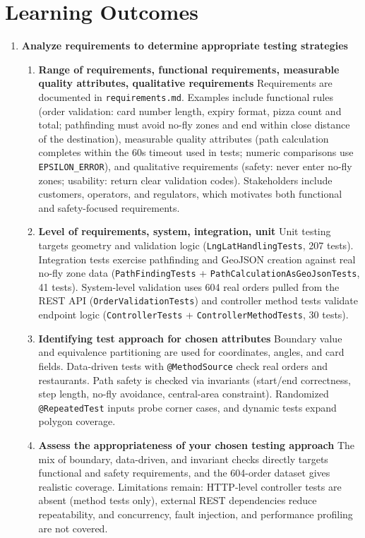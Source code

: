 \documentclass{article}
\begin{document}
\section{Learning Outcomes}
\begin{enumerate}
\item \textbf{Analyze requirements to determine appropriate testing strategies} \marginpar{[default 20\%]}
\begin{enumerate}
\item \textbf{Range of requirements, functional requirements, measurable quality attributes, qualitative requirements}
Requirements are documented in \texttt{requirements.md}. Examples include functional rules (order validation: card number length, expiry format, pizza count and total; pathfinding must avoid no-fly zones and end within close distance of the destination), measurable quality attributes (path calculation completes within the 60s timeout used in tests; numeric comparisons use \texttt{EPSILON\_ERROR}), and qualitative requirements (safety: never enter no-fly zones; usability: return clear validation codes). Stakeholders include customers, operators, and regulators, which motivates both functional and safety-focused requirements.

\item \textbf{Level of requirements, system, integration, unit}
Unit testing targets geometry and validation logic (\texttt{LngLatHandlingTests}, 207 tests). Integration tests exercise pathfinding and GeoJSON creation against real no-fly zone data (\texttt{PathFindingTests} + \texttt{PathCalculationAsGeoJsonTests}, 41 tests). System-level validation uses 604 real orders pulled from the REST API (\texttt{OrderValidationTests}) and controller method tests validate endpoint logic (\texttt{ControllerTests} + \texttt{ControllerMethodTests}, 30 tests).

\item \textbf{Identifying test approach for chosen attributes}
Boundary value and equivalence partitioning are used for coordinates, angles, and card fields. Data-driven tests with \texttt{@MethodSource} check real orders and restaurants. Path safety is checked via invariants (start/end correctness, step length, no-fly avoidance, central-area constraint). Randomized \texttt{@RepeatedTest} inputs probe corner cases, and dynamic tests expand polygon coverage.

\item \textbf{Assess the appropriateness of your chosen testing approach}
The mix of boundary, data-driven, and invariant checks directly targets functional and safety requirements, and the 604-order dataset gives realistic coverage. Limitations remain: HTTP-level controller tests are absent (method tests only), external REST dependencies reduce repeatability, and concurrency, fault injection, and performance profiling are not covered.
\end{enumerate}


\end{enumerate}
\end{document}
